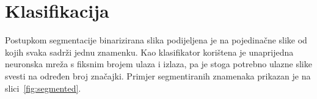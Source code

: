 \section{Klasifikacija}
\label{sec:klasifikacija}
Postupkom segmentacije binarizirana slika podijeljena je na pojedinačne slike od kojih svaka sadrži jednu znamenku. Kao
klasifikator korištena je unaprijedna neuronska mreža s fiksnim brojem ulaza i izlaza, pa je stoga potrebno ulazne slike
svesti na određen broj značajki. Primjer segmentiranih znamenaka prikazan je na slici\ \ref{fig:segmented}.
\begin{figure}[htb]
    \centering

\end{figure}
